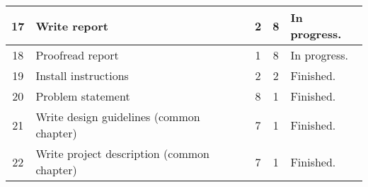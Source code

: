 \begin{center}
\begin{tabular}{| c | l | c | c | l |}
	17	& Write report								& 2 		& 8 				& In progress. 		\\	\hline
	18	& Proofread report 							& 1 		& 8 				& In progress. 		\\ 	\hline
	19	& Install instructions 						& 2 		& 2 				& Finished. 		\\	\hline
	20	& Problem statement							& 8 		& 1 				& Finished. 		\\	\hline
	21	& Write	design guidelines (common chapter)	& 7 		& 1 				& Finished. 		\\ 	\hline
	22	& Write	project description (common chapter)& 7 		& 1 				& Finished. 		\\ 	\hline
	\end{tabular}
\end{center}